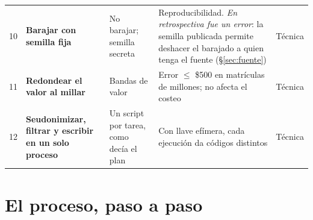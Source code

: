\documentclass[11pt,a4paper,twoside,twocolumn]{article}
\begin{document}
\begin{table}[tp]
\begin{tabularx}{\textwidth}{@{}r P{3.9cm} P{3.4cm} L P{2.3cm}@{}}
10 & \textbf{Barajar con semilla fija} & No barajar; semilla secreta & Reproducibilidad. \emph{En retrospectiva fue un error}: la semilla publicada permite deshacer el barajado a quien tenga el fuente (§\ref{sec:fuente}) & Técnica \\
11 & \textbf{Redondear el valor al millar} & Bandas de valor & Error $\leq$ \$500 en matrículas de millones; no afecta el costeo & Técnica \\
12 & \textbf{Seudonimizar, filtrar y escribir en un solo proceso} & Un script por tarea, como decía el plan & Con llave efímera, cada ejecución da códigos distintos & Técnica \\
\bottomrule
\end{tabularx}
\end{table}

\section{El proceso, paso a paso}\label{sec:proceso}
\end{document}
